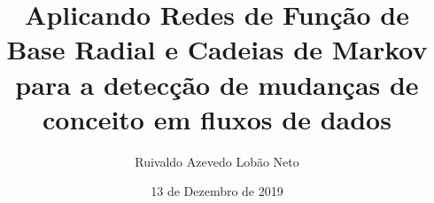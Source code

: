 \documentclass[msc, classic, a4paper]{ufbathesis}
\institute{Instituto de Matem\'{a}tica}
\title{Aplicando Redes de Função de Base Radial e Cadeias de Markov para a detecção de mudanças de conceito em fluxos de dados}
\date{13 de Dezembro de 2019}
\author{Ruivaldo Azevedo Lobão Neto}
\begin{document}
\pgcompfrontpage

\frontmatter

\pgcomppresentationpage










\resumo
\end{document}
